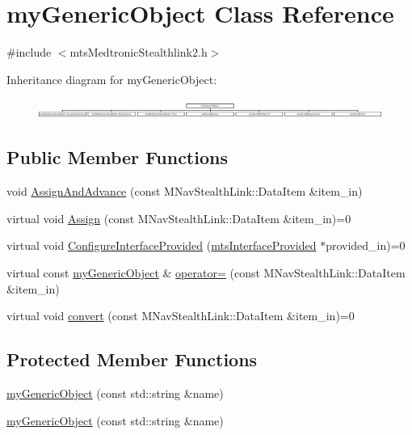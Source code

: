 \hypertarget{classmy_generic_object}{}\section{my\+Generic\+Object Class Reference}
\label{classmy_generic_object}


{\ttfamily \#include $<$mts\+Medtronic\+Stealthlink2.\+h$>$}

Inheritance diagram for my\+Generic\+Object\+:\begin{figure}[H]
\begin{center}
\leavevmode
\includegraphics[height=0.640000cm]{d4/d1b/classmy_generic_object}
\end{center}
\end{figure}
\subsection*{Public Member Functions}
\begin{DoxyCompactItemize}
\item 
void \hyperlink{classmy_generic_object_aa34e735b068433261af72e967d392e4b}{Assign\+And\+Advance} (const M\+Nav\+Stealth\+Link\+::\+Data\+Item \&item\+\_\+in)
\item 
virtual void \hyperlink{classmy_generic_object_a88d577e8ca5a3578605420efcdb6ca42}{Assign} (const M\+Nav\+Stealth\+Link\+::\+Data\+Item \&item\+\_\+in)=0
\item 
virtual void \hyperlink{classmy_generic_object_a261039f68cd49c1f275f0d209847b493}{Configure\+Interface\+Provided} (\hyperlink{classmts_interface_provided}{mts\+Interface\+Provided} $\ast$provided\+\_\+in)=0
\item 
virtual const \hyperlink{classmy_generic_object}{my\+Generic\+Object} \& \hyperlink{classmy_generic_object_aa2902952c2148f349e68d946ce0819fd}{operator=} (const M\+Nav\+Stealth\+Link\+::\+Data\+Item \&item\+\_\+in)
\item 
virtual void \hyperlink{classmy_generic_object_a07698576bb68e39af9614f28b511fb75}{convert} (const M\+Nav\+Stealth\+Link\+::\+Data\+Item \&item\+\_\+in)=0
\end{DoxyCompactItemize}
\subsection*{Protected Member Functions}
\begin{DoxyCompactItemize}
\item 
\hyperlink{classmy_generic_object_aa7261e9f0afdf6ef9aa96513d3537159}{my\+Generic\+Object} (const std\+::string \&name)
\item 
\hyperlink{classmy_generic_object_aa7261e9f0afdf6ef9aa96513d3537159}{my\+Generic\+Object} (const std\+::string \&name)
\end{DoxyCompactItemize}
